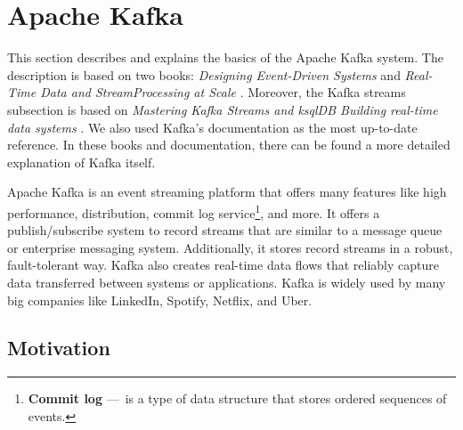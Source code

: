 \section{Apache Kafka}
\label{02:sec:title}

This section describes and explains the basics of the Apache Kafka system.
The description is based on two books: \emph{Designing Event-Driven Systems} \cite{apacheKafkaDesignDistributedSystems} and \emph{Real-Time Data and StreamProcessing at Scale} \cite{apacheKafkaDefinitiveGuide}.
Moreover, the Kafka streams subsection is based on \emph{Mastering Kafka Streams and ksqlDB Building real-time data systems} \cite{kafkaStreamsBook}.
We also used Kafka's documentation \cite{kafkaDocumentation} as the most up-to-date reference.
In these books and documentation, there can be found a more detailed explanation of Kafka itself.

Apache Kafka is an event streaming platform that offers many features like high performance, distribution, commit log service\footnote{\textbf{Commit log} 
---\ is a type of data structure that stores ordered sequences of events.}, and more.
It offers a publish/subscribe system to record streams that are similar to a message queue or enterprise messaging system.
Additionally, it stores record streams in a robust, fault-tolerant way.
Kafka also creates real-time data flows that reliably capture data transferred between systems or applications.
Kafka is widely used by many big companies like LinkedIn, Spotify, Netflix, and Uber.
\subsection{Motivation \cite{02-bachelor-thesis}}
\label{kafka:motivation}

